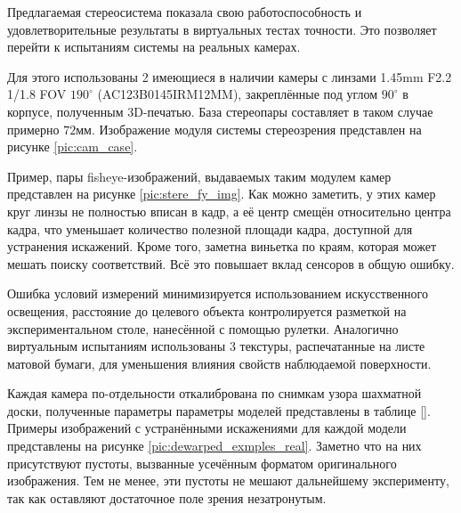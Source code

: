 
Предлагаемая стереосистема показала свою работоспособность и удовлетворительные результаты в виртуальных тестах 
точности. Это позволяет перейти к испытаниям системы на реальных камерах. 

Для этого использованы 2 имеющиеся в наличии камеры %
с линзами 1.45mm F2.2 1/1.8 FOV $190^\circ$ (AC123B0145IRM12MM), закреплённые под углом $90^\circ$ в корпусе,
полученным 3D-печатью. База стереопары составляет в таком случае примерно  $72мм$. Изображение модуля системы 
стереозрения представлен на рисунке \ref{pic:cam_case}. 


Пример, пары fisheye-изображений, выдаваемых таким модулем камер представлен на рисунке \ref{pic:stere_fy_img}. 
Как можно заметить, у этих камер круг линзы не полностью вписан в кадр, а её центр смещён относительно центра кадра,
 что уменьшает количество полезной площади кадра, доступной для устранения искажений. Кроме того, заметна виньетка 
по краям, которая может мешать поиску соответствий. Всё это повышает вклад сенсоров в общую ошибку. 


Ошибка условий измерений минимизируется использованием искусственного освещения, расстояние до целевого объекта
контролируется разметкой на экспериментальном столе, нанесённой с помощью рулетки. Аналогично виртуальным испытаниям 
использованы 3 текстуры, распечатанные на листе матовой бумаги, для уменьшения влияния свойств наблюдаемой поверхности.

Каждая камера по-отдельности откалибрована по снимкам узора шахматной доски, полученные параметры параметры моделей 
представлены в таблице \ref{}. Примеры изображений с устранёнными искажениями для каждой модели представлены на рисунке
 \ref{pic:dewarped_exmples_real}. Заметно что на них присутствуют пустоты, вызванные усечённым форматом оригинального 
 изображения. Тем не менее, эти пустоты не мешают дальнейшему эксперименту, так как оставляют достаточное поле зрения 
 незатронутым.

